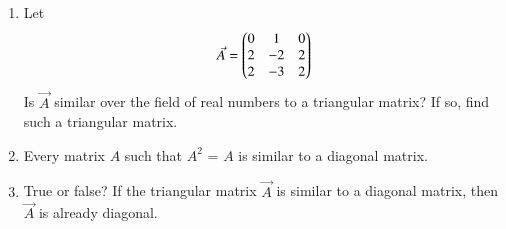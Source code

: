 \renewcommand{\theequation}{\theenumi}
\renewcommand{\thefigure}{\theenumi}
\begin{enumerate}[label=\thesubsection.\arabic*.,ref=\thesubsection.\theenumi]

\item %
Let
\begin{align}
    \Vec{A}=\begin{pmatrix}0&1&0\\2&-2&2\\2&-3&2\end{pmatrix}
\end{align}
Is $\vec{A}$ similar over the field of real numbers to a triangular matrix? If so, find such a triangular matrix.
\\
\solution

\twocolumn


\item  Every matrix $A$ such that $A^2$ = $A$ is similar to a diagonal matrix.
%
\\
\solution

\twocolumn
\item True or false? If the triangular matrix $\vec{A}$ is similar to a diagonal matrix, then $\vec{A}$ is already diagonal.
%
\\
\solution

\end{enumerate}
